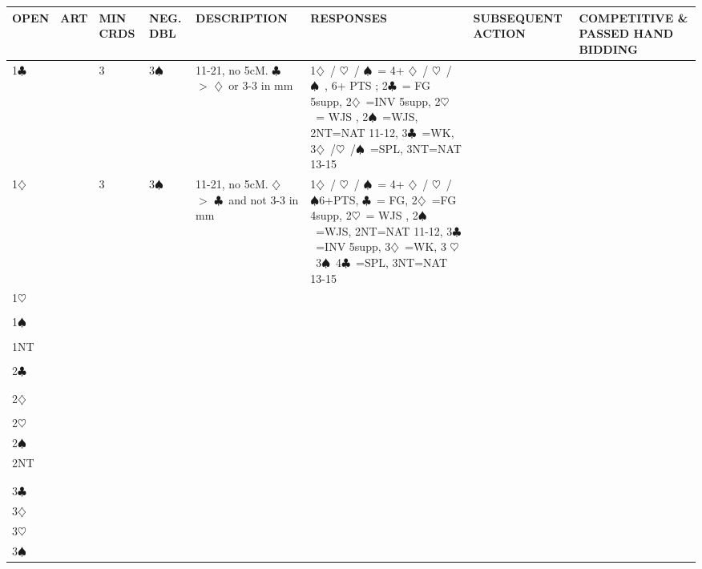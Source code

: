 \documentclass{article}
\newcommand\C{\ensuremath{\clubsuit}}
\newcommand\D{\ensuremath{\diamondsuit}}
\renewcommand\H{\ensuremath{\heartsuit}}
\renewcommand\S{\ensuremath{\spadesuit}}
\newcommand\N{{\footnotesize NT}}
\begin{document}
\noindent
\begin{tabular}{| p{9mm} | p{9mm} | p{9mm} | p{9mm} | p{54mm} | p{54mm} | p{54mm} | p{54mm} |}
	\hline
	\cellcolor[gray]{0.9} \textbf{OPEN} & \cellcolor[gray]{0.9} \textbf{ART} & \cellcolor[gray]{0.9} \textbf{MIN CRDS} & \cellcolor[gray]{0.9} \textbf{NEG. DBL} & \cellcolor[gray]{0.9} \textbf{DESCRIPTION} & \cellcolor[gray]{0.9} \textbf{RESPONSES} & \cellcolor[gray]{0.9} \textbf{SUBSEQUENT ACTION} & \cellcolor[gray]{0.9} \textbf{COMPETITIVE \& \cellcolor[gray]{0.9} PASSED HAND BIDDING} \\ \hline
	1\C & &3 & 3\S\ &11-21, no 5cM. \C\ $>$ \D\ or 3-3 in mm 
        & { 1\D\ / \H\ / \S\ = 4+ \D\ / \H\ / \S\ , 6+ PTS ; 2\C\ = FG 5supp, 2\D\ =INV 5supp, 2\H\ = WJS , 2\S\ =WJS, 2NT=NAT 11-12, 3\C\ =WK, 3\D\ /\H\ /\S\ =SPL, 3NT=NAT 13-15 } 
        &  & \\ \hline
	1\D & &3 & 3\S\ &11-21, no 5cM. \D\ $>$ \C\ and not 3-3 in mm 
        &1\D\ / \H\ / \S\ = 4+ \D\ / \H\ / \S 6+PTS, \2\C\ = FG, 2\D\ =FG 4supp, 2\H\ = WJS , 2\S\ =WJS, 2NT=NAT 11-12, 3\C\ =INV 5supp, 3\D\ =WK, 3 \H\ 3\S\ 4\C\ =SPL, 3NT=NAT 13-15 & & \\ \hline
	1\H & & & & & & & \\ \hline
	& & & & & & & \\ \hline
	1\S & & & & & & & \\ \hline
	& & & & & & & \\ \hline
	1\N & & & & & & & \\ \hline
	& & & & & & & \\ \hline
	2\C & & & & & & & \\ \hline
	& & & & & & & \\ \hline
	& & & & & & & \\ \hline
	2\D & & & & & & & \\ \hline
	& & & & & & & \\ \hline
	2\H & & & & & & & \\ \hline
	2\S & & & & & & & \\ \hline
	2\N & & & & & & & \\ \hline
	& & & & & & & \\ \hline
	& & & & & & & \\ \hline
	3\C & & & & & & & \\ \hline
	3\D & & & & & & & \\ \hline
	3\H & & & & & & & \\ \hline
	3\S & & & & & & & \\ \hline

\end{tabular}
\end{document}
